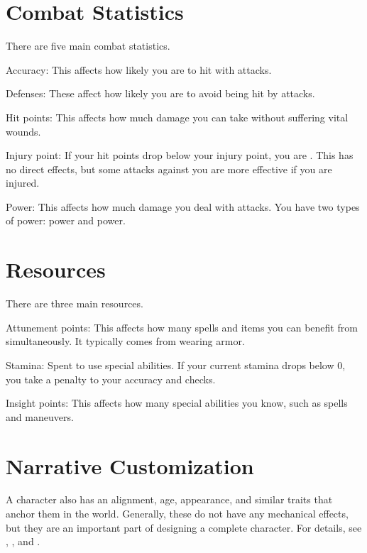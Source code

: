 \section{Combat Statistics}\label{Combat Statistics}
  There are five main combat statistics.
  \begin{raggeditemize}
    \item Accuracy: This affects how likely you are to hit with attacks.
    \item Defenses: These affect how likely you are to avoid being hit by attacks.
    \item Hit points: This affects how much damage you can take without suffering vital wounds.
    \item Injury point: If your hit points drop below your injury point, you are .
      This has no direct effects, but some attacks against you are more effective if you are injured.
    \item Power: This affects how much damage you deal with attacks.
      You have two types of power: \magical power and  power.
  \end{raggeditemize}

\section{Resources}
  There are three main resources.
  \begin{raggeditemize}
    \item Attunement points: This affects how many spells and items you can benefit from simultaneously.
      It typically comes from wearing armor.
    \item Stamina: Spent to use special abilities. If your current stamina drops below 0, you take a penalty to your accuracy and checks.
    \item Insight points: This affects how many special abilities you know, such as spells and maneuvers.
  \end{raggeditemize}

\section{Narrative Customization}
  A character also has an alignment, age, appearance, and similar traits that anchor them in the world.
  Generally, these do not have any mechanical effects, but they are an important part of designing a complete character.
  For details, see , , and .

